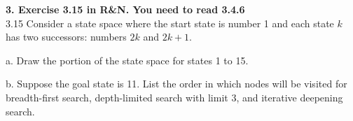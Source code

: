 \documentclass{article}
\begin{document}
\textbf{3. Exercise 3.15 in R\&N. You need to read 3.4.6} \\
3.15 Consider a state space where the start state is number 1 and each
state $k$ has two successors: numbers $2k$ and $2k + 1$. 

a. Draw the portion of the state space for states 1 to 15.

b. Suppose the goal state is 11. List the order in which nodes will be
visited for breadth-first search, depth-limited search with limit 3,
and iterative deepening search.
\end{document}
